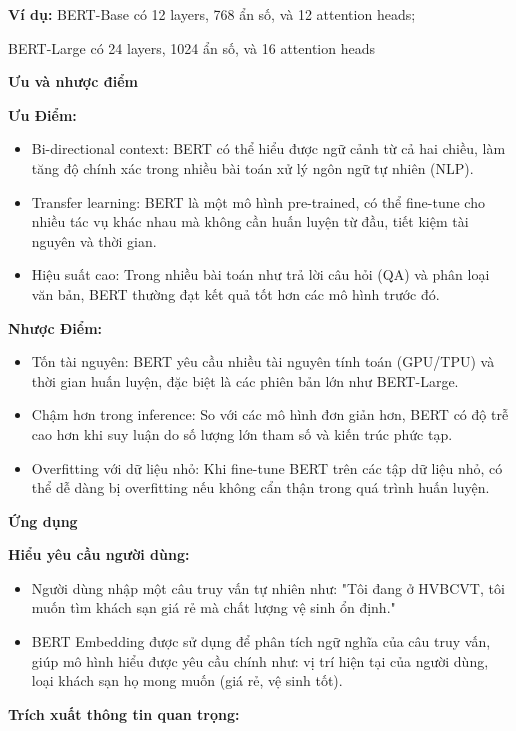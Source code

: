 \textbf{Ví dụ:}  BERT-Base có 12 layers, 768 ẩn số, và 12 attention heads; 

 BERT-Large có 24 layers, 1024 ẩn số, và 16 attention heads


\textbf{Ưu và nhược điểm } 

\textbf{Ưu Điểm:}

\begin{itemize}
    \item Bi-directional context: BERT có thể hiểu được ngữ cảnh từ cả hai chiều, làm tăng độ chính xác trong nhiều bài toán xử lý ngôn ngữ tự nhiên (NLP).
    \item Transfer learning: BERT là một mô hình pre-trained, có thể fine-tune cho nhiều tác vụ khác nhau mà không cần huấn luyện từ đầu, tiết kiệm tài nguyên và thời gian.
    \item Hiệu suất cao: Trong nhiều bài toán như trả lời câu hỏi (QA) và phân loại văn bản, BERT thường đạt kết quả tốt hơn các mô hình trước đó.
\end{itemize}

\textbf{Nhược Điểm:}
\begin{itemize}
    \item Tốn tài nguyên: BERT yêu cầu nhiều tài nguyên tính toán (GPU/TPU) và thời gian huấn luyện, đặc biệt là các phiên bản lớn như BERT-Large.
    \item Chậm hơn trong inference: So với các mô hình đơn giản hơn, BERT có độ trễ cao hơn khi suy luận do số lượng lớn tham số và kiến trúc phức tạp.
    \item Overfitting với dữ liệu nhỏ: Khi fine-tune BERT trên các tập dữ liệu nhỏ, có thể dễ dàng bị overfitting nếu không cẩn thận trong quá trình huấn luyện.
\end{itemize}

\textbf{Ứng dụng }

\textbf{Hiểu yêu cầu người dùng:}

\begin{itemize}
    \item Người dùng nhập một câu truy vấn tự nhiên như: "Tôi đang ở HVBCVT, tôi muốn tìm khách sạn giá rẻ mà chất lượng vệ sinh ổn định."
    \item BERT Embedding được sử dụng để phân tích ngữ nghĩa của câu truy vấn, giúp mô hình hiểu được yêu cầu chính như: vị trí hiện tại của người dùng, loại khách sạn họ mong muốn (giá rẻ, vệ sinh tốt).
\end{itemize}

\textbf{Trích xuất thông tin quan trọng:}

